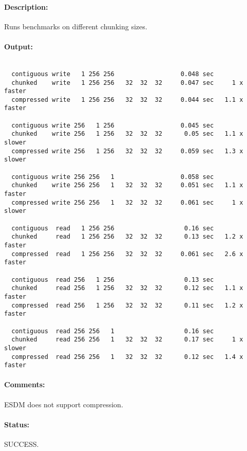 \paragraph{Description:} Runs benchmarks on different chunking sizes.

\paragraph{Output:}

\begin{verbatim}

  contiguous write   1 256 256                  0.048 sec
  chunked    write   1 256 256   32  32  32     0.047 sec     1 x faster
  compressed write   1 256 256   32  32  32     0.044 sec   1.1 x faster

  contiguous write 256   1 256                  0.045 sec
  chunked    write 256   1 256   32  32  32      0.05 sec   1.1 x slower
  compressed write 256   1 256   32  32  32     0.059 sec   1.3 x slower

  contiguous write 256 256   1                  0.058 sec
  chunked    write 256 256   1   32  32  32     0.051 sec   1.1 x faster
  compressed write 256 256   1   32  32  32     0.061 sec     1 x slower

  contiguous  read   1 256 256                   0.16 sec
  chunked     read   1 256 256   32  32  32      0.13 sec   1.2 x faster
  compressed  read   1 256 256   32  32  32     0.061 sec   2.6 x faster

  contiguous  read 256   1 256                   0.13 sec
  chunked     read 256   1 256   32  32  32      0.12 sec   1.1 x faster
  compressed  read 256   1 256   32  32  32      0.11 sec   1.2 x faster

  contiguous  read 256 256   1                   0.16 sec
  chunked     read 256 256   1   32  32  32      0.17 sec     1 x slower
  compressed  read 256 256   1   32  32  32      0.12 sec   1.4 x faster

\end{verbatim}

\paragraph{Comments:} ESDM does not support compression.

\paragraph{Status:} SUCCESS.

